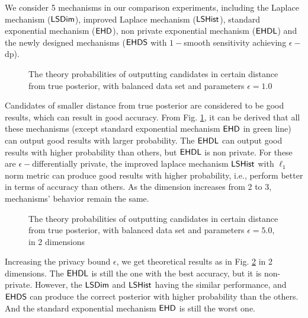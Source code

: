 \documentclass{article}
\begin{document}
We consider 5 mechanisms in our comparison experiments, including the Laplace mechanism ($\mathsf{LSDim}$), improved Laplace mechanism ($\mathsf{LSHist}$),
standard exponential mechanism ($\mathsf{EHD}$),
non private exponential mechanism ($\mathsf{EHDL}$) and the newly designed mechanisms ($\mathsf{EHDS}$ with $1-$smooth sensitivity achieving $\epsilon-$dp).

\begin{figure}
\begin{center}
\centering
\caption{The theory probabilities of outputting candidates in certain distance from true posterior, with balanced data set and parameters $\epsilon = 1.0$}
\label{fig_theory}
\end{center}
\end{figure}

Candidates of smaller distance from true posterior are considered to be good results, which can result in good accuracy. From Fig. \ref{fig_theory}, it can be derived that all these mechanisms (except standard exponential mechanism $\mathsf{EHD}$ in green line) can output good results with larger probability. The $\mathsf{EHDL}$ can output good results with higher probability than others, but $\mathsf{EHDL}$ is non private. For these are $\epsilon -$differentially private, the improved laplace mechanism $\mathsf{LSHist}$ with $\ell_1$ norm metric can produce good results with higher probability, i.e., perform better in terms of accuracy than others. As the dimension increases from 2 to 3, mechanisms' behavior remain the same.

\begin{figure}
\begin{center}
\centering
\caption{The theory probabilities of outputting candidates in certain distance from true posterior, with balanced data set and parameters $\epsilon = 5.0$, in 2 dimensions}
\label{fig_theory_epsilon}
\end{center}
\end{figure}

Increasing the privacy bound $\epsilon$, we get theoretical results as in Fig. \ref{fig_theory_epsilon} in 2 dimensions. The $\mathsf{EHDL}$ is still the one with the best accuracy, but it is non-private. However, the $\mathsf{LSDim}$ and $\mathsf{LSHist}$ having the similar performance, and $\mathsf{EHDS}$ can produce the correct posterior with higher probability than the others. And the standard exponential mechanism $\mathsf{EHD}$ is still the worst one.
\end{document}
